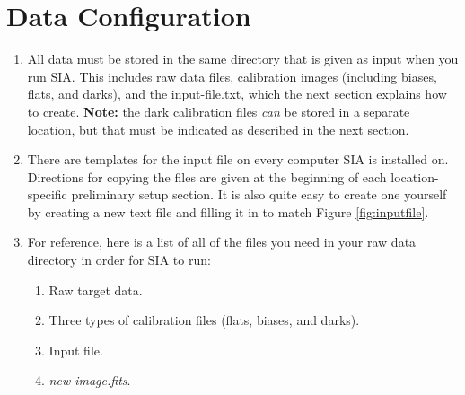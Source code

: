\documentclass[11pt]{report}
\begin{document}
\section{Data Configuration}
\label{sect:dataconfig}
\begin{enumerate}
\item All data must be stored in the same directory that is given as input when you run SIA. This includes raw data files, calibration images (including biases, flats, and darks), and the input-file.txt, which the next section explains how to create. {\bf Note:} the dark calibration files \emph{can} be stored in a separate location, but that must be indicated as described in the next section.
\item There are templates for the input file on every computer SIA is installed on. Directions for copying the files are given at the beginning of each location-specific preliminary setup section. It is also quite easy to create one yourself by creating a new text file and filling it in to match Figure \ref{fig:inputfile}.
\item For reference, here is a list of all of the files you need in your raw data directory in order for SIA to run:  \label{itm:filelist}
	\begin{enumerate}
		\item Raw target data.
		\item Three types of calibration files (flats, biases, and darks).
		\item Input file.
		\item \emph{new-image.fits}.
	\end{enumerate}
\end{enumerate}
\end{document}
